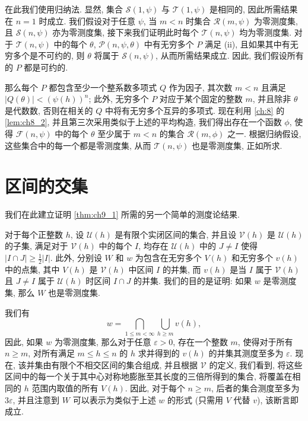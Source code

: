 在此我们使用归纳法. 显然, 集合 $\mathscr{S}(1,\psi)$ 与 $\mathscr{T}(1,\psi)$ 是相同的, 因此所需结果在 $n = 1$ 时成立. 我们假设对于任意 $\psi$, 当 $m < n$ 时集合 $\mathscr{R}(m, \psi)$ 为零测度集, 且 $\mathscr{S}(n, \psi)$ 亦为零测度集, 接下来我们证明此时每个 $\mathscr{T}(n, \psi)$ 均为零测度集. 对于 $\mathscr{T}(n, \psi)$ 中的每个 $\theta$, $\mathscr{P}(n, \psi, \theta)$ 中有无穷多个 $P$ 满足 (ii), 且如果其中有无穷多个是不可约的, 则 $\theta$ 将属于 $\mathscr{S}(n, \psi)$, 从而所需结果成立. 因此, 我们假设所有的 $P$ 都是可约的.

那么每个 $P$ 都包含至少一个整系数多项式 $Q$ 作为因子, 其次数 $m < n$ 且满足 $|Q(\theta)| < (\psi(h))^n$; 此外, 无穷多个 $P$ 对应于某个固定的整数 $m$, 并且除非 $\theta$ 是代数数, 否则在相关的 $Q$ 中将有无穷多个互异的多项式. 现在利用 \autoref{ch:8} 的 \autoref{lem:ch8_2}, 并且第三次采用类似于上述的平均构造, 我们得出存在一个函数 $\phi$, 使得 $\mathscr{F}(n,\psi)$ 中的每个 $\theta$ 至少属于 $m < n$ 的集合 $\mathscr{R}(m,\phi)$ 之一. 根据归纳假设, 这些集合中的每一个都是零测度集, 从而 $\mathscr{T}(n, \psi)$ 也是零测度集, 正如所求.

\section{区间的交集}\label{sec:ch9_4}

我们在此建立证明 \autoref{thm:ch9_1} 所需的另一个简单的测度论结果.

对于每个正整数 $h$, 设 $\mathscr{U}(h)$ 是有限个实闭区间的集合, 并且设 $\mathscr{V}(h)$ 是 $\mathscr{U}(h)$ 的子集, 满足对于 $\mathscr{V}(h)$ 中的每个 $I$, 均存在 $\mathscr{U}(h)$ 中的 $J \neq I$ 使得 $|I \cap J| \geq \frac{1}{2}|I|$. 此外, 分别设 $W$ 和 $w$ 为包含在无穷多个 $V(h)$ 和无穷多个 $v(h)$ 中的点集, 其中 $V(h)$ 是 $\mathscr{V}(h)$ 中区间 $I$ 的并集, 而 $v(h)$ 是当 $I$ 属于 $\mathscr{V}(h)$ 且 $J \neq I$ 属于 $\mathscr{U}(h)$ 时区间 $I \cap J$ 的并集. 我们的目的是证明: 如果 $w$ 是零测度集, 那么 $W$ 也是零测度集.

我们有
\[w = \bigcap_{1 \leq m < \infty} \bigcup_{h \geq m} v(h),\]
因此, 如果 $w$ 为零测度集, 那么对于任意 $\varepsilon > 0$, 存在一个整数 $m$, 使得对于所有 $n \ge m$, 对所有满足 $m \le h \le n$ 的 $h$ 求并得到的 $v(h)$ 的并集其测度至多为 $\varepsilon$. 现在, 该并集由有限个不相交区间的集合组成, 并且根据 $\mathscr{V}$ 的定义, 我们看到, 将这些区间中的每一个关于其中心对称地膨胀至其长度的三倍所得到的集合, 将覆盖在相同的 $h$ 范围内取值的所有 $V(h)$. 因此, 对于每个 $n \ge m$, 后者的集合测度至多为 $3\varepsilon$, 并且注意到 $W$ 可以表示为类似于上述 $w$ 的形式 (只需用 $V$ 代替 $v$), 该断言即成立.

